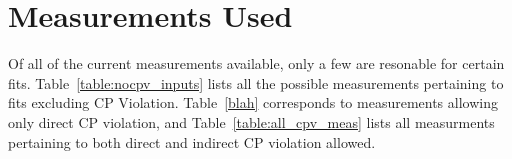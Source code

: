 \section{Measurements Used}
\label{sec:measurements}

Of all of the current measurements available, only a few are resonable
for certain fits. Table~\ref{table:nocpv_inputs} lists all the possible
 measurements pertaining to fits excluding CP Violation. Table~\ref{blah}
corresponds to measurements allowing only direct CP violation, and 
Table~\ref{table:all_cpv_meas} lists all measurments pertaining to both
direct and indirect CP violation allowed.
%



